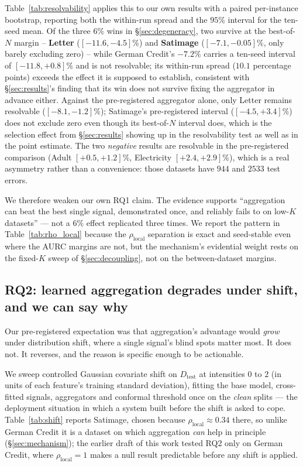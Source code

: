 \documentclass[conference]{IEEEtran}
\begin{document}
Table~\ref{tab:resolvability} applies this to our own results with a
paired per-instance bootstrap, reporting both the within-run spread and
the $95\%$ interval for the ten-seed mean. Of the three $6\%$ wins in
\S\ref{sec:degeneracy}, two survive at the best-of-$N$ margin --
\textbf{Letter} ($[-11.6, -4.5]\%$) and \textbf{Satimage}
($[-7.1, -0.05]\%$, only barely excluding zero) -- while German Credit's
$-7.2\%$ carries a ten-seed interval of $[-11.8, +0.8]\%$ and is not
resolvable; its within-run spread ($10.1$ percentage points) exceeds the
effect it is supposed to establish, consistent with \S\ref{sec:results}'s
finding that its win does not survive fixing the aggregator in advance
either. Against the pre-registered aggregator alone, only Letter remains
resolvable ($[-8.1, -1.2]\%$); Satimage's pre-registered interval
($[-4.5, +3.4]\%$) does not exclude zero even though its best-of-$N$
interval does, which is the selection effect from \S\ref{sec:results}
showing up in the resolvability test as well as in the point estimate.
The two \emph{negative} results are resolvable in the pre-registered
comparison (Adult $[+0.5, +1.2]\%$, Electricity $[+2.4, +2.9]\%$), which
is a real asymmetry rather than a convenience: those datasets have $944$
and $2533$ test errors.

We therefore weaken our own RQ1 claim. The evidence supports
``aggregation can beat the best single signal, demonstrated once, and
reliably fails to on low-$K$ datasets'' --- not a $6\%$ effect
replicated three times. We report the pattern in
Table~\ref{tab:rho_local} because the $\rho_{\mathrm{local}}$
separation is exact and seed-stable even where the AURC margins are not,
but the mechanism's evidential weight rests on the fixed-$K$ sweep of
\S\ref{sec:decoupling}, not on the between-dataset margins.




\subsection{RQ2: learned aggregation degrades under shift, and we can say why}
\label{sec:rq2}

Our pre-registered expectation was that aggregation's advantage would
\emph{grow} under distribution shift, where a single signal's blind spots
matter most. It does not. It reverses, and the reason is specific enough
to be actionable.

We sweep controlled Gaussian covariate shift on $D_{\mathrm{test}}$ at
intensities $0$ to $2$ (in units of each feature's training standard
deviation), fitting the base model, cross-fitted signals, aggregators and
conformal threshold once on the \emph{clean} splits --- the deployment
situation in which a system built before the shift is asked to cope.
Table~\ref{tab:shift} reports Satimage, chosen because
$\rho_{\mathrm{local}} \approx 0.34$ there, so unlike German Credit it is
a dataset on which aggregation \emph{can} help in principle
(\S\ref{sec:mechanism}); the earlier draft of this work tested RQ2 only on
German Credit, where $\rho_{\mathrm{local}} = 1$ makes a null result
predictable before any shift is applied.
\end{document}
